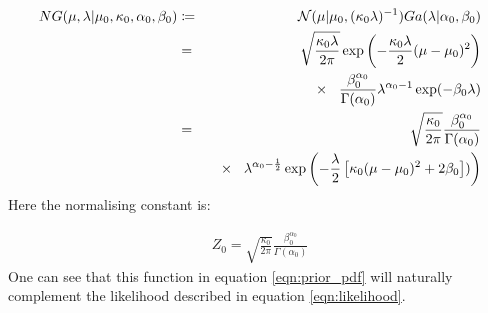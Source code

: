 \documentclass[12pt]{article} %
\begin{document}
	\begin{eqnarray}
	NG(\mu, \lambda | \mu_0, \kappa_0, \alpha_0, \beta_0) &\coloneqq& \mathcal{N}(\mu | \mu_0, (\kappa_0 \lambda)^{-1})Ga(\lambda | \alpha_0, \beta_0) \\
	&=&  \sqrt{\frac{\kappa_0 \lambda}{2\pi}} \exp \left(- \frac{\kappa_0 \lambda}{2}(\mu - \mu_0) ^ 2\right) \\
	& & \hspace{3mm} \times \hspace{3mm} \frac{\beta_0 ^{\alpha_0}}{\Gamma(\alpha_0)} \lambda ^{\alpha_0 - 1} \exp(-\beta_0 \lambda) \\
	&=& \sqrt{\frac{\kappa_0}{2\pi}} \frac{\beta_0 ^ {\alpha_0}}{\Gamma(\alpha_0)} \\
	& & \hspace{3mm} \times \hspace{3mm}  \lambda^{\alpha_0 - \frac{1}{2}} \exp\left(-\frac{\lambda}{2}\left[\kappa_0 (\mu - \mu_0)^2 + 2 \beta_0\right])\right) \label{eqn:prior_pdf}
	\end{eqnarray}
	Here the normalising constant is:
	
	\begin{eqnarray}
	Z_0 = \sqrt{\frac{\kappa_0}{2\pi}} \frac{\beta_0 ^ {\alpha_0}}{\Gamma(\alpha_0)}
	\end{eqnarray}
	One can see that this function in equation \ref{eqn:prior_pdf} will naturally complement the likelihood described in equation \ref{eqn:likelihood}.
	
	
\end{document}

